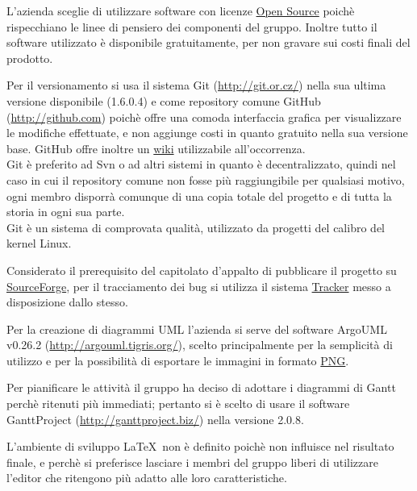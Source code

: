 L'azienda sceglie di utilizzare software con licenze \underline{Open Source} poich\`e rispecchiano le linee di pensiero dei componenti del gruppo. Inoltre tutto il software utilizzato \`e disponibile gratuitamente, per non gravare sui costi finali del prodotto.
 
Per il versionamento si usa il sistema Git (\href{http://git.or.cz/}{http://git.or.cz/}) nella sua ultima versione disponibile (1.6.0.4) e come repository comune GitHub (\href{http://github.com}{http://github.com}) poich\`e offre una comoda interfaccia grafica per visualizzare le modifiche effettuate, e non aggiunge costi in quanto gratuito nella sua versione base. GitHub offre inoltre un \underline{wiki} utilizzabile all'occorrenza.\\
Git \`e preferito ad Svn o ad altri sistemi in quanto \`e decentralizzato, quindi nel caso in cui il repository comune non fosse pi\`u raggiungibile per qualsiasi motivo, ogni membro disporr\`a comunque di una copia totale del progetto e di tutta la storia in ogni sua parte.\\
Git \`e un sistema di comprovata qualit\`a, utilizzato da progetti del calibro del kernel Linux.
 
Considerato il prerequisito del capitolato d'appalto di pubblicare il progetto su \href{http://sourceforge.net}{SourceForge}, per il tracciamento dei bug si utilizza il sistema \href{https://sourceforge.net/tracker/?group_id=245619}{Tracker} messo a disposizione dallo stesso.
 
Per la creazione di diagrammi UML l'azienda si serve del software ArgoUML v0.26.2 (\href{http://argouml.tigris.org/}{http://argouml.tigris.org/}), scelto principalmente per la semplicit\`a di utilizzo e per la possibilit\`a di esportare le immagini in formato \underline{PNG}.
 
Per pianificare le attivit\`a il gruppo ha deciso di adottare i diagrammi di Gantt perch\`e ritenuti pi\`u immediati; pertanto si \`e scelto di usare il software GanttProject (\href{http://ganttproject.biz/}{http://ganttproject.biz/}) nella versione 2.0.8.
 
L'ambiente di sviluppo \LaTeX \ non \`e definito poich\`e non influisce nel risultato finale, e perch\`e si preferisce lasciare i membri del gruppo liberi di utilizzare l'editor che ritengono pi\`u adatto alle loro caratteristiche.
 
